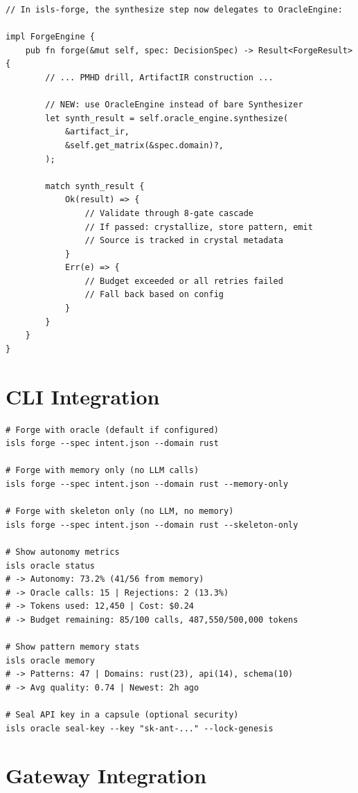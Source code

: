\documentclass[11pt,a4paper,twoside]{article}
\theoremstyle{definition}
\theoremstyle{plain}
\theoremstyle{remark}
\begin{document}
\begin{lstlisting}[title={Modified ForgeEngine (C23)}]
// In isls-forge, the synthesize step now delegates to OracleEngine:

impl ForgeEngine {
    pub fn forge(&mut self, spec: DecisionSpec) -> Result<ForgeResult> {
        // ... PMHD drill, ArtifactIR construction ...

        // NEW: use OracleEngine instead of bare Synthesizer
        let synth_result = self.oracle_engine.synthesize(
            &artifact_ir,
            &self.get_matrix(&spec.domain)?,
        );

        match synth_result {
            Ok(result) => {
                // Validate through 8-gate cascade
                // If passed: crystallize, store pattern, emit
                // Source is tracked in crystal metadata
            }
            Err(e) => {
                // Budget exceeded or all retries failed
                // Fall back based on config
            }
        }
    }
}
\end{lstlisting}


\section{CLI Integration}\label{sec:cli}

\begin{lstlisting}
# Forge with oracle (default if configured)
isls forge --spec intent.json --domain rust

# Forge with memory only (no LLM calls)
isls forge --spec intent.json --domain rust --memory-only

# Forge with skeleton only (no LLM, no memory)
isls forge --spec intent.json --domain rust --skeleton-only

# Show autonomy metrics
isls oracle status
# -> Autonomy: 73.2% (41/56 from memory)
# -> Oracle calls: 15 | Rejections: 2 (13.3%)
# -> Tokens used: 12,450 | Cost: $0.24
# -> Budget remaining: 85/100 calls, 487,550/500,000 tokens

# Show pattern memory stats
isls oracle memory
# -> Patterns: 47 | Domains: rust(23), api(14), schema(10)
# -> Avg quality: 0.74 | Newest: 2h ago

# Seal API key in a capsule (optional security)
isls oracle seal-key --key "sk-ant-..." --lock-genesis
\end{lstlisting}


\section{Gateway Integration}\label{sec:gateway}
\end{document}
